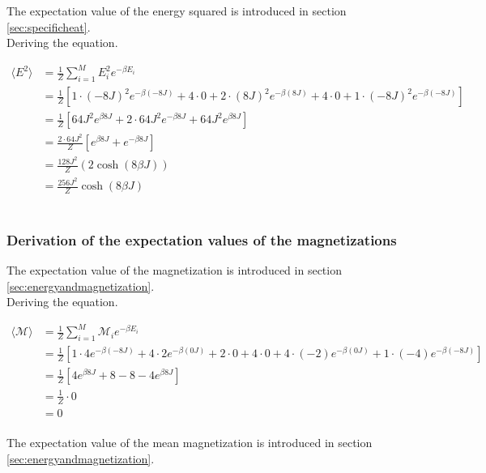 \documentclass{article}
\begin{document}
The expectation value of the energy squared is introduced in section \ref{sec:specificheat}. \\

Deriving the equation.

\begin{align*}
  \langle E^2 \rangle &= \frac{1}{Z} \sum _{i=1} ^M E_i^2 e^{- \beta E_i} \\
  &= \frac{1}{Z} \left[ 1 \cdot (-8J)^2 e^{- \beta (-8J)} + 4 \cdot 0 + 2 \cdot (8J)^2 e^{- \beta (8J)} + 4 \cdot 0 + 1 \cdot (-8J)^2 e^{- \beta (-8J)} \right] \\
  &= \frac{1}{Z} \left[ 64 J^2 e^{\beta 8J} + 2 \cdot 64 J^2 e^{- \beta 8J} + 64 J^2 e^{ \beta 8J} \right] \\
  &= \frac{2 \cdot 64 J^2}{Z} \left[ e^{\beta 8 J} + e^{- \beta 8 J} \right] \\
  &= \frac{128 J^2}{Z} (2 \cosh(8 \beta J) ) \\
  &= \frac{256 J^2}{Z} \cosh(8 \beta J)
\end{align*} \\


\subsubsection{Derivation of the expectation values of the magnetizations} \label{sec:derivationmagnetizations}

The expectation value of the magnetization is introduced in section \ref{sec:energyandmagnetization}. \\

Deriving the equation.

\begin{align*}
  \langle \mathcal{M} \rangle &= \frac{1}{Z} \sum _{i=1} ^M \mathcal{M}_i e^{- \beta E_i} \\
  &= \frac{1}{Z} \left[1 \cdot 4 e^{- \beta (-8J)} + 4 \cdot 2 e^{- \beta (0J)} + 2 \cdot 0 + 4 \cdot 0 + 4 \cdot (-2)
  e^{- \beta (0J)} + 1 \cdot (-4) e^{- \beta (-8J)} \right] \\
  &= \frac{1}{Z} \left[ 4 e^{\beta 8J} + 8 - 8 - 4 e^{ \beta 8J} \right] \\
  &= \frac{1}{Z} \cdot 0 \\
  &= 0
\end{align*} \\

The expectation value of the mean magnetization is introduced in section \ref{sec:energyandmagnetization}. \\
\end{document}
